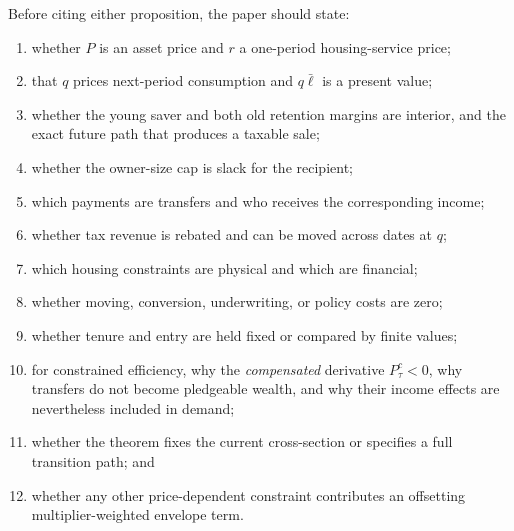 \documentclass[11pt]{article}
\newcommand{\1}{\mathbf 1}
\newcommand{\ellbar}{\bar\ell}
\begin{document}
Before citing either proposition, the paper should state:
\begin{enumerate}
\item whether $P$ is an asset price and $r$ a one-period housing-service price;
\item that $q$ prices next-period consumption and $q\ellbar$ is a present value;
\item whether the young saver and both old retention margins are interior, and
the exact future path that produces a taxable sale;
\item whether the owner-size cap is slack for the recipient;
\item which payments are transfers and who receives the corresponding income;
\item whether tax revenue is rebated and can be moved across dates at $q$;
\item which housing constraints are physical and which are financial;
\item whether moving, conversion, underwriting, or policy costs are zero;
\item whether tenure and entry are held fixed or compared by finite values;
\item for constrained efficiency, why the \emph{compensated} derivative
$P_\tau^c<0$, why transfers do not become pledgeable wealth, and why their
income effects are nevertheless included in demand;
\item whether the theorem fixes the current cross-section or specifies a full
transition path; and
\item whether any other price-dependent constraint contributes an offsetting
multiplier-weighted envelope term.
\end{enumerate}
\end{document}

